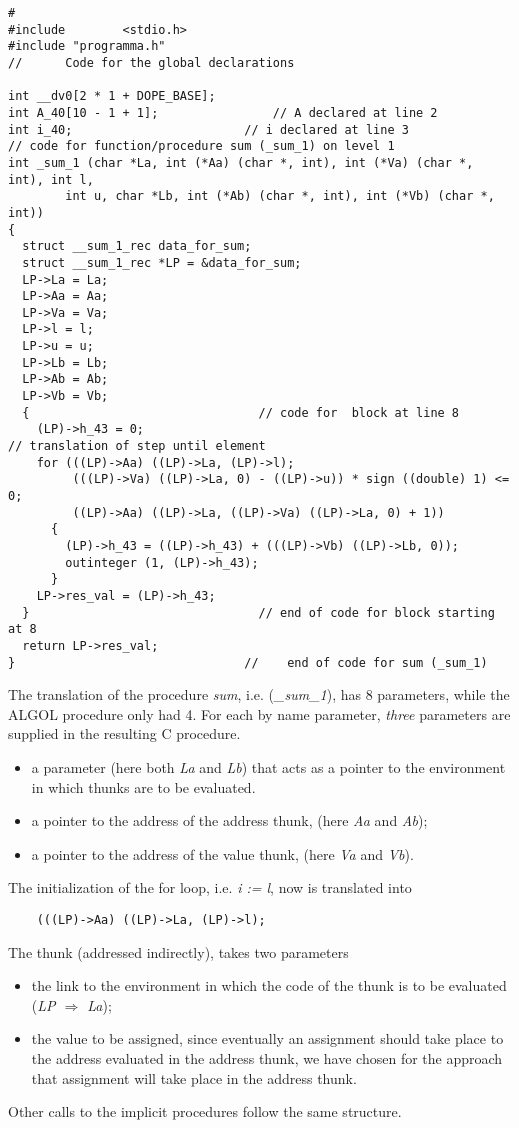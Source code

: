\documentclass[11pt]{article}
\begin{document}
{\footnotesize
\begin{verbatim}
#
#include        <stdio.h>
#include "programma.h"
//      Code for the global declarations

int __dv0[2 * 1 + DOPE_BASE];
int A_40[10 - 1 + 1];                // A declared at line 2
int i_40;                        // i declared at line 3
// code for function/procedure sum (_sum_1) on level 1
int _sum_1 (char *La, int (*Aa) (char *, int), int (*Va) (char *, int), int l,
        int u, char *Lb, int (*Ab) (char *, int), int (*Vb) (char *, int))
{
  struct __sum_1_rec data_for_sum;
  struct __sum_1_rec *LP = &data_for_sum;
  LP->La = La;
  LP->Aa = Aa;
  LP->Va = Va;
  LP->l = l;
  LP->u = u;
  LP->Lb = Lb;
  LP->Ab = Ab;
  LP->Vb = Vb;
  {                                // code for  block at line 8 
    (LP)->h_43 = 0;
// translation of step until element
    for (((LP)->Aa) ((LP)->La, (LP)->l);
         (((LP)->Va) ((LP)->La, 0) - ((LP)->u)) * sign ((double) 1) <= 0;
         ((LP)->Aa) ((LP)->La, ((LP)->Va) ((LP)->La, 0) + 1))
      {
        (LP)->h_43 = ((LP)->h_43) + (((LP)->Vb) ((LP)->Lb, 0));
        outinteger (1, (LP)->h_43);
      }
    LP->res_val = (LP)->h_43;
  }                                // end of code for block starting at 8
  return LP->res_val;
}                                //    end of code for sum (_sum_1)
\end{verbatim}
}
The translation of the procedure {\em sum}, i.e. ({\em \_sum\_1}),
has 8 parameters, while the ALGOL procedure only had 4.
For each by name parameter, {\em three} parameters are
supplied in the resulting C procedure.
\begin{itemize}
\item a parameter (here both {\em La} and {\em Lb}) that acts as
a pointer to the environment in which thunks are
to be evaluated.
\item a pointer to the address of the address thunk,
(here {\em Aa} and {\em Ab});
\item a pointer to the address of the value thunk,
(here {\em Va} and {\em Vb}).
\end{itemize}
The initialization of the for loop, i.e. {\em i := l}, now is translated
into
{\footnotesize
\begin{verbatim}
    (((LP)->Aa) ((LP)->La, (LP)->l);
\end{verbatim}
}
The thunk (addressed indirectly), takes two parameters
\begin{itemize}
\item the link to the environment in which the code of the thunk is to be
evaluated ({\em LP $\Rightarrow$ La});
\item the value to be assigned, since eventually an assignment should take place
to the address evaluated in the address thunk, we have chosen for
the approach that assignment will take
place in the address thunk.
\end{itemize}
Other calls to the implicit procedures follow the same structure.
\end{document}
